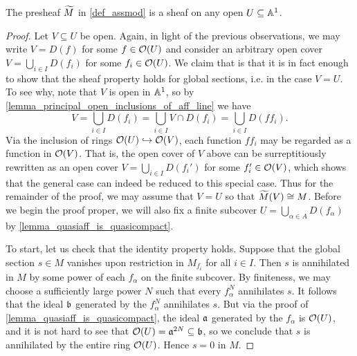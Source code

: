 
\begin{proposition}
  \label{prop_shf_assoc_to_mod}
  The presheaf $\widetilde{{M}}$ in \cref{def_assmod} is a sheaf on any
  open $U \subseteq \mathbb{A}^{{1}}$.
\end{proposition}

\begin{proof}
  Let $V \subseteq U$ be open.
  Again, in light of the previous observations, we may write $V =
  D(f)$ for some $f \in \mathcal{O}(U)$ and consider an arbitrary open
  cover $V = \bigcup_{i \in I} D(f_i)$ for some $f_i \in \mathcal{O}(U)$.
  We claim that is that it is in fact enough to show that the sheaf
  property holds for global sections, i.e. in the case $V = U$.
  To see why, note that $V$ is open in $\mathbb{A}^{{1}}$, so by
  \cref{lemma_principal_open_inclusions_of_aff_line} we have
  \[
    V
    = \bigcup_{i \in I} D(f_i)
    = \bigcup_{i \in I} V \cap D(f_i)
    = \bigcup_{i \in I} D(ff_i).
  \]
  Via the inclusion of rings $\mathcal{O}(U) \hookrightarrow \mathcal{O}(V)$, each
  function $f f_i$ may be regarded as a function in $\mathcal{O}(V)$.
  That is, the open cover of $V$ above can be surreptitiously
  rewritten as an open cover $V = \bigcup_{i \in I} D(f_i')$ for some
  $f_i' \in \mathcal{O}(V)$, which shows that the general case can indeed
  be reduced to this special case.
  Thus for the remainder of the proof, we may assume that $V = U$ so
  that $\widetilde{{M}}(V) \cong M$.
  Before we begin the proof proper, we will also fix a finite
  subcover $U = \bigcup_{\alpha \in A} D(f_\alpha)$ by
  \cref{lemma_quasiaff_is_quasicompact}.

  To start, let us check that the identity property holds.
  Suppose that the global section $s \in M$ vanishes upon restriction
  in $M_{f_i}$ for all $i \in I$.
  Then $s$ is annihilated in $M$ by some power of each $f_\alpha$ on
  the finite subcover.
  By finiteness, we may choose a sufficiently large power $N$ such
  that every $f_\alpha^N$ annihilates $s$.
  It follows that the ideal $\mathfrak{b}$ generated by the $f_\alpha^N$
  annihilates $s$.
  But via the proof of \cref{lemma_quasiaff_is_quasicompact}, the
  ideal $\mathfrak{a}$ generated by the $f_\alpha$ is $\mathcal{O}(U)$, and
  it is not hard to see that $\mathcal{O}(U) = \mathfrak{a}^{2N} \subseteq
  \mathfrak{b}$, so we conclude that $s$ is annihilated by the entire
  ring $\mathcal{O}(U)$.
  Hence $s = 0$ in $M$.


\end{proof}
